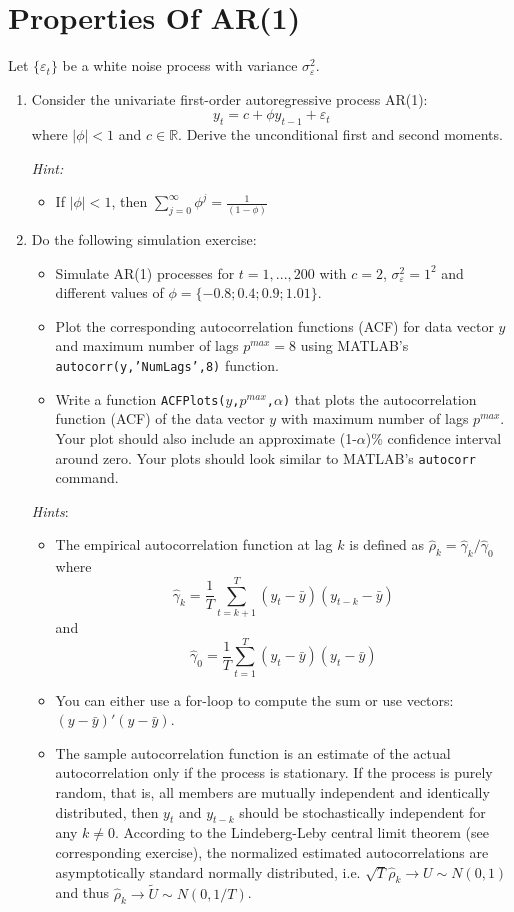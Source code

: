 \section[Properties of AR(1)]{Properties Of AR(1)\label{ex:PropertiesAR1}}

Let $\{\varepsilon_t\}$ be a white noise process with variance $\sigma_\varepsilon^2$.

\begin{enumerate}
\item Consider the univariate first-order autoregressive process AR(1): 
$$y_t = c + \phi y_{t-1} + \varepsilon_{t}$$
where $|\phi|<1$ and $c\in \mathbb{R}$.
Derive the unconditional first and second moments.

\emph{Hint:}
\begin{itemize}
	\item If $|\phi|<1$, then $\sum_{j=0}^{\infty} \phi^j = \frac{1}{(1-\phi)}$
\end{itemize}

\item Do the following simulation exercise:
\begin{itemize}
	\item Simulate AR(1) processes for $t=1,...,200$ with $c=2$, $\sigma_\varepsilon^2 = 1^2$ and different values of $\phi=\{-0.8;0.4;0.9;1.01\}$.
	\item Plot the corresponding autocorrelation functions (ACF) for data vector $y$ and maximum number of lags $p^{max}=8$ using MATLAB's \texttt{autocorr(y,'NumLags',8)} function.
	\item Write a function \texttt{ACFPlots($y$,$p^{max}$,$\alpha$)} that plots the autocorrelation function (ACF) of the data vector $y$ with maximum number of lags $p^{max}$.
	Your plot should also include an approximate (1-$\alpha$)\% confidence interval around zero.
	Your plots should look similar to MATLAB's \texttt{autocorr} command.
\end{itemize}
	
\emph{Hints}:
\begin{itemize}
	\item The empirical autocorrelation function at lag $k$ is defined as $\hat{\rho}_k = \hat{\gamma}_k/\hat{\gamma}_0$ where
	  $$\hat{\gamma}_k = \frac{1}{T} \sum_{t=k+1}^T (y_t - \bar{y})(y_{t-k}-\bar{y})$$ and $$\hat{\gamma}_0 = \frac{1}{T} \sum_{t=1}^T (y_t - \bar{y})(y_{t}-\bar{y})$$
	\item You can either use a for-loop to compute the sum or use vectors: $(y - \bar{y})'(y - \bar{y})$.
	\item The sample autocorrelation function is an estimate of the actual autocorrelation only if the process is stationary.
	If the process is purely random, that is, all members are mutually independent and identically distributed,
	  then $y_t$ and $y_{t-k}$ should be stochastically independent for any $k\neq 0$.
	According to the Lindeberg-Leby central limit theorem (see corresponding exercise),
	  the normalized estimated autocorrelations are asymptotically standard normally distributed,
	  i.e. $\sqrt{T} \hat{\rho}_k \rightarrow U \sim N(0,1)$ and thus $\hat{\rho}_k \rightarrow \tilde{U} \sim N(0,1/T)$.
\end{itemize}


\end{enumerate}
